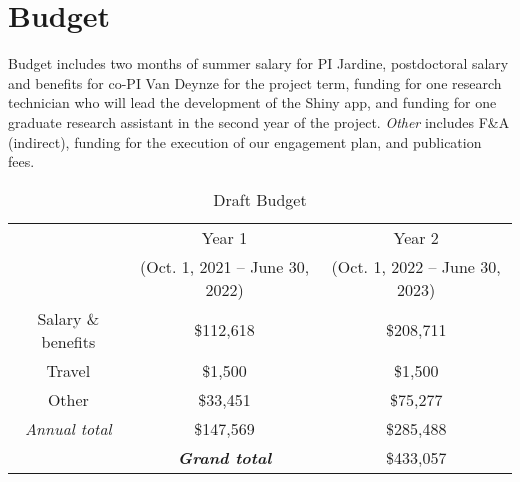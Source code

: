 \documentclass[12pt]{elsarticle}
\begin{document}
	\section{Budget}
	Budget includes two months of summer salary for PI Jardine, postdoctoral salary and benefits for co-PI Van Deynze for the project term, funding for one research technician who will lead the development of the Shiny app, and funding for one graduate research assistant in the second year of the project. \textit{Other} includes F\&A (indirect), funding for the execution of our engagement plan, and publication fees.
	
		\begin{table}[h]
				\caption{Draft Budget} 	
			\centering
				\begin{tabular}{ ccc } %
			\hline
			 & Year 1  & Year 2  \\
			 & (Oct. 1, 2021 -- June 30, 2022) & (Oct. 1, 2022 -- June 30, 2023) \\
			 \hline
			\rowcolor[gray]{.9} Salary \& benefits &  \$112,618  & \$208,711 \\ 
			Travel & \$1,500 & \$1,500 \\
			\rowcolor[gray]{.9} Other & \$33,451 & \$75,277 \\
			\hline
			\textit{Annual total} & \$147,569 & \$285,488 \\
			\hline
			& \textbf{\textit{Grand total}} & \$433,057 \\
			\hline
		\end{tabular}
	\end{table}

	
	
	
	\clearpage
	\footnotesize
	
\end{document}

